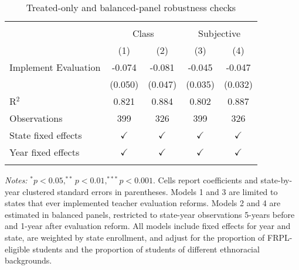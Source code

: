 
\begin{table}[!htbp]
   \caption{\label{tab:robust} Treated-only and balanced-panel robustness checks}
   \bigskip
   \centering
   \begin{tabular}{lcccc}
       \hline \hline \\[-1.8ex]
       & \multicolumn{2}{c}{Class} & \multicolumn{2}{c}{Subjective}\\
                           & (1)           & (2)           & (3)           & (4)\\  
      \midrule 
      Implement Evaluation & -0.074        & -0.081        & -0.045        & -0.047\\   
                           & (0.050)       & (0.047)       & (0.035)       & (0.032)\\   
       \midrule
      R$^2$                & 0.821         & 0.884         & 0.802         & 0.887\\  
      Observations         & 399           & 326           & 399           & 326\\  
       \midrule
      State fixed effects  & $\checkmark$  & $\checkmark$  & $\checkmark$  & $\checkmark$\\   
      Year fixed effects   & $\checkmark$  & $\checkmark$  & $\checkmark$  & $\checkmark$\\   
       \hline \hline \\[-1.8ex]
   \end{tabular}
   
   \par \justifying
   \small \textit{Notes:} $^{*}p<0.05, ^{**}p<0.01, ^{***}p<0.001$. Cells report coefficients and state-by-year clustered standard errors in parentheses. Models 1 and 3 are limited to states that ever implemented teacher evaluation reforms. Models 2 and 4 are estimated in balanced panels, restricted to state-year observations 5-years before and 1-year after evaluation reform. All models include fixed effects for year and state, are weighted by state enrollment, and adjust for the proportion of FRPL-eligible students and the proportion of students of different ethnoracial backgrounds.
\end{table}


